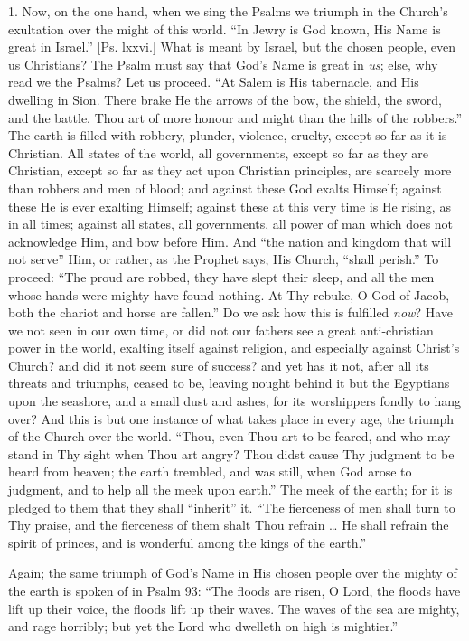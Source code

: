 1. Now, on the one hand, when we sing the Psalms we triumph in the
Church's exultation over the might of this world. ``In Jewry is
God known, His Name is great in Israel.'' [Ps. lxxvi.] What is
meant by Israel, but the chosen people, even us Christians? The Psalm
must say that God's Name is great in \emph{us}; else, why read we the
Psalms? Let us proceed. ``At Salem is His tabernacle, and His
dwelling in Sion. There brake He the arrows of the bow, the shield,
the sword, and the battle. Thou art of more honour and might than the
hills of the robbers.'' The earth is filled with robbery, plunder,
violence, cruelty, except so far as it is Christian. All states of the
world, all governments, except so far as they are Christian, except so
far as they act upon Christian principles, are scarcely more than
robbers and men of blood; and against these God exalts Himself;
against these He is ever exalting Himself; against these at this very
time is He rising, as in all times; against all states, all
governments, all power of man which does not acknowledge Him, and bow
before Him. And ``the nation and kingdom that will not serve''
Him, or rather, as the Prophet says, His Church, ``shall
perish.'' To proceed: ``The proud are robbed, they have slept
their sleep, and all the men whose hands were mighty have found
nothing. At Thy rebuke, O God of Jacob, both the chariot and horse are
fallen.'' Do we ask how this is fulfilled \emph{now}? Have we not
seen in our own time, or did not our fathers see a great anti-christian
power in the world, exalting itself against religion, and especially
against Christ's Church? and did it not seem sure of success? and yet
has it not, after all its threats and triumphs, ceased to be, leaving
nought behind it but the Egyptians upon the seashore, and a small dust
and ashes, for its worshippers fondly to hang over? And this is but
one instance of what takes place in every age, the triumph of the
Church over the world. ``Thou, even Thou art to be feared, and who
may stand in Thy sight when Thou art angry? Thou didst cause Thy
judgment to be heard from heaven; the earth trembled, and was still,
when God arose to judgment, and to help all the meek upon earth.''
The meek of the earth; for it is pledged to them that they shall
``inherit'' it. ``The fierceness of men shall turn to Thy
praise, and the fierceness of them shalt Thou refrain … He shall
refrain the spirit of princes, and is wonderful among the kings of the
earth.''

Again; the same triumph of God's Name in His chosen people over the
mighty of the earth is spoken of in Psalm 93: ``The floods are
risen, O Lord, the floods have lift up their voice, the floods lift up
their waves. The waves of the sea are mighty, and rage horribly; but
yet the Lord who dwelleth on high is mightier.''

